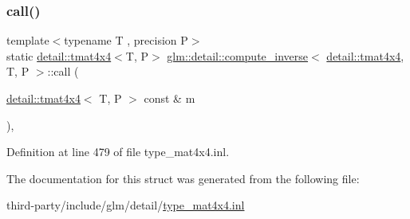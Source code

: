 \subsubsection{\texorpdfstring{call()}{call()}}
{\footnotesize\ttfamily template$<$typename T , precision P$>$ \\
static \hyperlink{structglm_1_1detail_1_1tmat4x4}{detail\+::tmat4x4}$<$T, P$>$ \hyperlink{structglm_1_1detail_1_1compute__inverse}{glm\+::detail\+::compute\+\_\+inverse}$<$ \hyperlink{structglm_1_1detail_1_1tmat4x4}{detail\+::tmat4x4}, T, P $>$\+::call (\begin{DoxyParamCaption}\item[{\hyperlink{structglm_1_1detail_1_1tmat4x4}{detail\+::tmat4x4}$<$ T, P $>$ const \&}]{m }\end{DoxyParamCaption})\hspace{0.3cm}{\ttfamily [inline]}, {\ttfamily [static]}}



Definition at line 479 of file type\+\_\+mat4x4.\+inl.



The documentation for this struct was generated from the following file\+:\begin{DoxyCompactItemize}
\item 
third-\/party/include/glm/detail/\hyperlink{type__mat4x4_8inl}{type\+\_\+mat4x4.\+inl}\end{DoxyCompactItemize}
